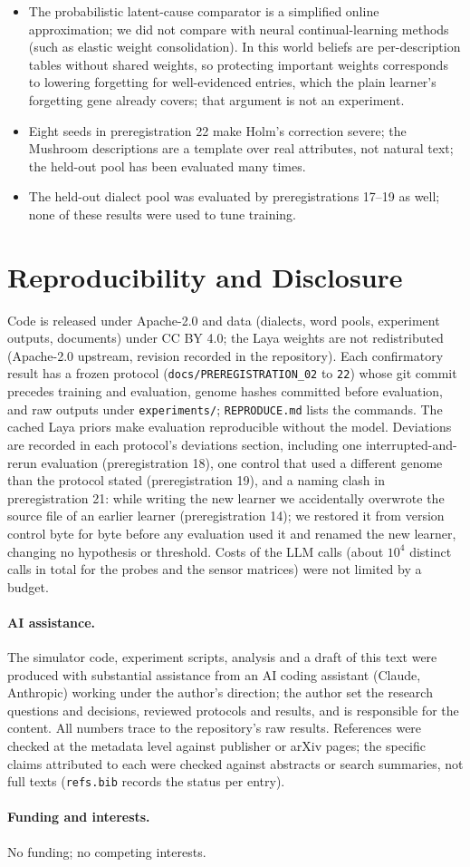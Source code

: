 \documentclass[11pt]{article}
\begin{document}
\begin{itemize}
  \item The probabilistic latent-cause comparator is a simplified online approximation; we did not compare with neural continual-learning methods (such as elastic weight consolidation). In this world beliefs are per-description tables without shared weights, so protecting important weights corresponds to lowering forgetting for well-evidenced entries, which the plain learner's forgetting gene already covers; that argument is not an experiment.
  \item Eight seeds in preregistration 22 make Holm's correction severe; the Mushroom descriptions are a template over real attributes, not natural text; the held-out pool has been evaluated many times.
  \item The held-out dialect pool was evaluated by preregistrations 17--19 as well; none of these results were used to tune training.
\end{itemize}

\section{Reproducibility and Disclosure}
Code is released under Apache-2.0 and data (dialects, word pools, experiment outputs, documents) under CC BY 4.0; the Laya weights are not redistributed (Apache-2.0 upstream, revision recorded in the repository). Each confirmatory result has a frozen protocol (\texttt{docs/PREREGISTRATION\_02} to \texttt{22}) whose git commit precedes training and evaluation, genome hashes committed before evaluation, and raw outputs under \texttt{experiments/}; \texttt{REPRODUCE.md} lists the commands. The cached Laya priors make evaluation reproducible without the model. Deviations are recorded in each protocol's deviations section, including one interrupted-and-rerun evaluation (preregistration 18), one control that used a different genome than the protocol stated (preregistration 19), and a naming clash in preregistration 21: while writing the new learner we accidentally overwrote the source file of an earlier learner (preregistration 14); we restored it from version control byte for byte before any evaluation used it and renamed the new learner, changing no hypothesis or threshold. Costs of the LLM calls (about $10^{4}$ distinct calls in total for the probes and the sensor matrices) were not limited by a budget.

\paragraph{AI assistance.} The simulator code, experiment scripts, analysis and a draft of this text were produced with substantial assistance from an AI coding assistant (Claude, Anthropic) working under the author's direction; the author set the research questions and decisions, reviewed protocols and results, and is responsible for the content. All numbers trace to the repository's raw results. References were checked at the metadata level against publisher or arXiv pages; the specific claims attributed to each were checked against abstracts or search summaries, not full texts (\texttt{refs.bib} records the status per entry).

\paragraph{Funding and interests.} No funding; no competing interests.



\end{document}
